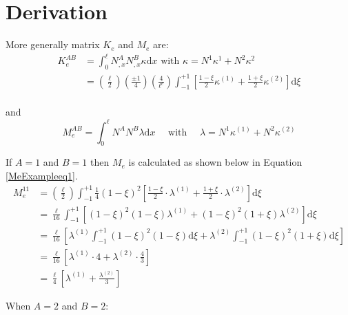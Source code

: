 \chapter{Derivation}
 More generally matrix $K_e$ and $M_e$ are: 
\begin{equation}
\begin{aligned}
K_e^{AB} &= \int_0^\ell N_{,x}^A N_{,x}^B \kappa \text{d}x \text{ with } \kappa = N^1 \kappa^1 + N^2 \kappa^2 \\
&= \left(\frac{\ell}{2}\right)\left(\frac{\pm 1}{4}\right)\left(\frac{4}{\ell^e}\right) \int_{-1}^{+1} \left[ \frac{1 -\xi}{2} \kappa^{(1)} + \frac{1 + \xi}{2} \kappa^{(2)} \right] \text{d}\xi\\
\end{aligned}
\end{equation}

and
\begin{equation}
M_e^{AB} = \int_0^\ell N^A N^B \lambda \text{d}x \quad\text{ with }\quad \lambda = N^1 \kappa^{(1)} + N^2 \kappa^{(2)}
\end{equation}

If $A=1$ and $B=1$ then $M_e$ is calculated as shown below in Equation \ref{MeExampleeq1}.
\begin{equation} \label{MeExampleeq1}
\begin{aligned}
M_e^{11} &= \left(\frac{\ell}{2}\right) \int_{-1}^{+1} \frac{1}{4} (1-\xi)^2\left[ \frac{1-\xi}{2} \cdot \lambda^{(1)} + \frac{1+\xi}{2} \cdot \lambda^{(2)} \right] \text{d} \xi \\
&= \frac{\ell}{16} \int_{-1}^{+1} \left[
	(1-\xi)^2(1-\xi) \lambda^{(1)}
	+ (1-\xi)^2(1+\xi) \lambda^{(2)}
\right] \text{d}\xi \\
&= \frac{\ell}{16} \left[
	\lambda^{(1)} \int_{-1}^{+1} (1-\xi)^2(1-\xi) \text{d}\xi
	+ \lambda^{(2)} \int_{-1}^{+1} (1-\xi)^2(1+\xi) \text{d}\xi
\right] \\
&= \frac{\ell}{16} \left[
	\lambda^{(1)} \cdot 4
	+ \lambda^{(2)} \cdot \frac{4}{3}
\right] \\
&= \frac{\ell}{4} \left[
	\lambda^{(1)} + \frac{\lambda^{(2)}}{3}
\right]
\end{aligned}
\end{equation}
 
 When $A=2$ and $B=2$:

